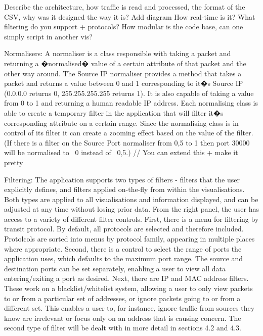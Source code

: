 {\color{red} Describe the architecture, how traffic is read and processed, the format of the CSV, why was it designed the way it is? Add diagram}
{\color{red} How real-time is it? What filtering do you support + protocols?}
{\color{red} How modular is the code base, can one simply script in another vis?}

Normalisers:
A normaliser is a class responsible with taking a packet and returning a �normalised� value of a certain attribute of that packet and the other way around. The Source IP normaliser provides a method that takes a packet and returns a value between 0 and 1 corresponding to it�s Source IP (0.0.0.0 returns 0, 255.255.255.255 returns 1). It is also capable of taking a value from 0 to 1 and returning a human readable IP address. 
Each normalising class is able to create a temporary filter in the application that will filter it�s corresponding attribute on a certain range. 
Since the normalising class is in control of its filter it can create a zooming effect based on the value of the filter. 
(If there is a filter on the Source Port normaliser from 0,5 to 1 then port 30000 will be normalised to ~0 instead of ~0,5.)
// You can extend this + make it pretty

Filtering:
The application supports two types of filters - filters that the user explicitly defines, and filters applied on-the-fly from within the visualisations.
Both types are applied to all visualisations and information displayed, and can be adjusted at any time without losing prior data.
From the right panel, the user has access to a variety of different filter controls.  First, there is a menu for filtering by transit protocol. By default, all protocols are selected and therefore included. Protolcols are sorted into menus by protocol family, appearing in multiple places where appropriate. Second, there is a control to select the range of ports the application uses, which defaults to the maximum port range.  The source and destination ports can be set separately, enabling a user to view all data entering/exiting a port as desired.  Next, there are IP and MAC address filters.  These work on a blacklist/whitelist system, allowing a user to only view packets to or from a particular set of addresses, or ignore packets going to or from a different set.  This enables a user to, for instance, ignore traffic from sources they know are irrelevant or focus only on an address that is causing concern.
The second type of filter will be dealt with in more detail in sections 4.2 and 4.3.

